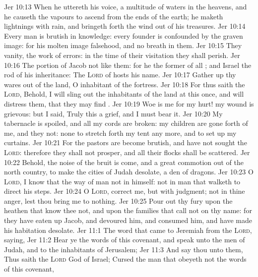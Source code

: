 \vs Jer 10:13 When he uttereth his voice,  a multitude of waters in the heavens, and he causeth the vapours to ascend from the ends of the earth; he maketh lightnings with rain, and bringeth forth the wind out of his treasures.
\vs Jer 10:14 Every man is brutish in  knowledge: every founder is confounded by the graven image: for his molten image  falsehood, and  no breath in them.
\vs Jer 10:15 They  vanity,  the work of errors: in the time of their visitation they shall perish.
\vs Jer 10:16 The portion of Jacob  not like them: for he  the former of all ; and Israel  the rod of his inheritance: The \textsc{Lord} of hosts  his name.
\vs Jer 10:17 Gather up thy wares out of the land, O inhabitant of the fortress.
\vs Jer 10:18 For thus saith the \textsc{Lord}, Behold, I will sling out the inhabitants of the land at this once, and will distress them, that they may find .
\vs Jer 10:19 Woe is me for my hurt! my wound is grievous: but I said, Truly this  a grief, and I must bear it.
\vs Jer 10:20 My tabernacle is spoiled, and all my cords are broken: my children are gone forth of me, and they  not:  none to stretch forth my tent any more, and to set up my curtains.
\vs Jer 10:21 For the pastors are become brutish, and have not sought the \textsc{Lord}: therefore they shall not prosper, and all their flocks shall be scattered.
\vs Jer 10:22 Behold, the noise of the bruit is come, and a great commotion out of the north country, to make the cities of Judah desolate,  a den of dragons.
\vs Jer 10:23 O \textsc{Lord}, I know that the way of man  not in himself:  not in man that walketh to direct his steps.
\vs Jer 10:24 O \textsc{Lord}, correct me, but with judgment; not in thine anger, lest thou bring me to nothing.
\vs Jer 10:25 Pour out thy fury upon the heathen that know thee not, and upon the families that call not on thy name: for they have eaten up Jacob, and devoured him, and consumed him, and have made his habitation desolate.
\vs Jer 11:1 The word that came to Jeremiah from the \textsc{Lord}, saying,
\vs Jer 11:2 Hear ye the words of this covenant, and speak unto the men of Judah, and to the inhabitants of Jerusalem;
\vs Jer 11:3 And say thou unto them, Thus saith the \textsc{Lord} God of Israel; Cursed  the man that obeyeth not the words of this covenant,
